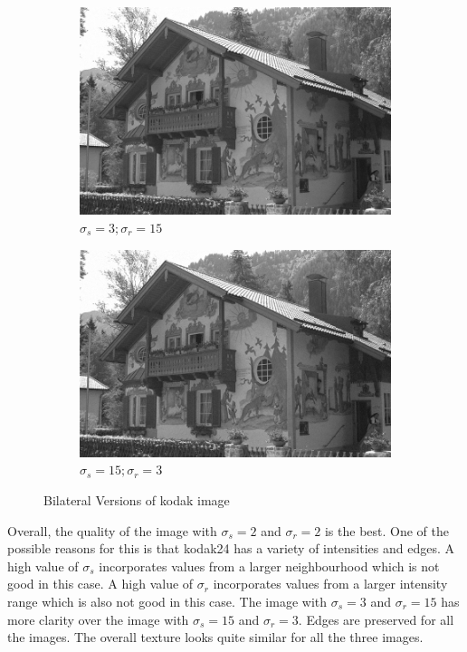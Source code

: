 \documentclass[12pt]{article}
\begin{document}
\begin{figure}[h]
\begin{subfigure}[b]{0.24\textwidth}
        \includegraphics[width=\textwidth]{../images/filtered_kodak24_bilateral_sigma_s_3_sigma_r_15.png}
        \caption{$\sigma_s=3;\sigma_r=15$}
        \label{fig:subfig3}
    \end{subfigure}
    \begin{subfigure}[b]{0.24\textwidth}
        \centering
        \includegraphics[width=\textwidth]{../images/filtered_kodak24_bilateral_sigma_s_15_sigma_r_3.png}
        \caption{$\sigma_s=15;\sigma_r=3$}
        \label{fig:subfig3}
    \end{subfigure}
    
    \caption{Bilateral Versions of kodak image }
    \label{fig:overall}
\end{figure}


Overall, the quality of the image with $\sigma_s=2$ and $\sigma_r=2$ is the best. One of the possible reasons for this is that kodak24 has a variety of intensities and edges. A high value of $\sigma_s$ incorporates values from a larger neighbourhood which is not good in this case. A high value of $\sigma_r$ incorporates values from a larger intensity range which is also not good in this case. The image with $\sigma_s=3$ and $\sigma_r=15$ has more clarity over the image with $\sigma_s=15$ and $\sigma_r=3$. Edges are preserved for all the images. The overall texture looks quite similar for all the three images. 
\end{document}
